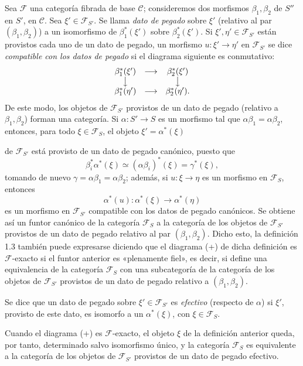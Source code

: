  Sea $\mathcal F$ una categoría fibrada de base
$\mathcal C$; consideremos dos morfismos $\beta_1,\beta_2$ de $S''$ en $S'$,
en $\mathcal C$. Sea
$\xi'\in\mathcal F_{S'}$. Se llama \emph{dato de pegado} sobre $\xi'$
(relativo al par $(\beta_1,\beta_2)$) a un isomorfismo de
$\beta_1^*(\xi')$ sobre $\beta_2^*(\xi')$. Si $\xi',\eta'\in\mathcal F_{S'}$
están provistos cada uno de un dato de pegado, un morfismo
$u:\xi'\longrightarrow\eta'$ en $\mathcal F_{S'}$ se dice
\emph{compatible con los datos de pegado} si el diagrama siguiente es
conmutativo:
\[
\begin{array}{ccc}
  \beta_1^*(\xi') & \longrightarrow & \beta_2^*(\xi') \\
  \big\downarrow && \big\downarrow \\
  \beta_1^*(\eta') & \longrightarrow & \beta_2^*(\eta').
\end{array}
\]
De este modo, los objetos de $\mathcal F_{S'}$ provistos de un dato de pegado
(relativo a $\beta_1,\beta_2$) forman una categoría. Si
$\alpha:S'\longrightarrow S$ es un morfismo tal que
$\alpha\beta_1=\alpha\beta_2$, entonces, para todo $\xi\in\mathcal F_S$, el
objeto $\xi'=\alpha^*(\xi)$

de $\mathcal F_{S'}$ está provisto de un dato de pegado canónico, puesto que
\[
  \beta_i^*\alpha^*(\xi)\simeq(\alpha\beta_i)^*(\xi)=\gamma^*(\xi),
\]
tomando de nuevo $\gamma=\alpha\beta_1=\alpha\beta_2$; además, si
$u:\xi\longrightarrow\eta$ es un morfismo en $\mathcal F_S$, entonces
\[
  \alpha^*(u):\alpha^*(\xi)\longrightarrow\alpha^*(\eta)
\]
es un morfismo en $\mathcal F_{S'}$ compatible con los datos de pegado
canónicos. Se obtiene así un funtor canónico de la categoría $\mathcal F_S$ a
la categoría de los objetos de $\mathcal F_{S'}$ provistos de un dato de pegado
relativo al par $(\beta_1,\beta_2)$. Dicho esto, la definición 1.3 también
puede expresarse diciendo que el diagrama (+) de dicha definición es
$\mathcal F$-exacto si el funtor anterior es «plenamente fiel», es decir, si
define una equivalencia de la categoría $\mathcal F_S$ con una subcategoría de
la categoría de los objetos de $\mathcal F_{S'}$ provistos de un dato de pegado
relativo a $(\beta_1,\beta_2)$.

 Se dice que un dato de pegado sobre
$\xi'\in\mathcal F_{S'}$ es \emph{efectivo} (respecto de $\alpha$) si
$\xi'$, provisto de este dato, es isomorfo a un $\alpha^*(\xi)$, con
$\xi\in\mathcal F_S$.

Cuando el diagrama (+) es $\mathcal F$-exacto, el objeto $\xi$ de la definición
anterior queda, por tanto, determinado salvo isomorfismo único, y la categoría
$\mathcal F_S$ es equivalente a la categoría de los objetos de
$\mathcal F_{S'}$ provistos de un dato de pegado efectivo.

